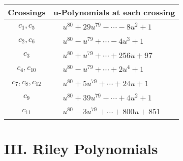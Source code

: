 \documentclass[1p]{elsarticle_modified}
\theoremstyle{definition}
\begin{document}
\begin{tabular}{m{50pt}|m{274pt}}
Crossings & \hspace{64pt}u-Polynomials at each crossing \\
\hline $$\begin{aligned}c_{1},c_{5}\end{aligned}$$&$\begin{aligned}
&u^{80}+29 u^{79}+\cdots-8 u^2+1
\end{aligned}$\\
\hline $$\begin{aligned}c_{2},c_{6}\end{aligned}$$&$\begin{aligned}
&u^{80}- u^{79}+\cdots-4 u^3+1
\end{aligned}$\\
\hline $$\begin{aligned}c_{3}\end{aligned}$$&$\begin{aligned}
&u^{80}+u^{79}+\cdots+256 u+97
\end{aligned}$\\
\hline $$\begin{aligned}c_{4},c_{10}\end{aligned}$$&$\begin{aligned}
&u^{80}- u^{79}+\cdots+2 u^4+1
\end{aligned}$\\
\hline $$\begin{aligned}c_{7},c_{8},c_{12}\end{aligned}$$&$\begin{aligned}
&u^{80}+5 u^{79}+\cdots+24 u+1
\end{aligned}$\\
\hline $$\begin{aligned}c_{9}\end{aligned}$$&$\begin{aligned}
&u^{80}+39 u^{79}+\cdots+4 u^2+1
\end{aligned}$\\
\hline $$\begin{aligned}c_{11}\end{aligned}$$&$\begin{aligned}
&u^{80}-3 u^{79}+\cdots+800 u+851
\end{aligned}$\\
\hline
\end{tabular}\newpage\renewcommand{\arraystretch}{1}
\centering \section*{ III. Riley Polynomials}
\end{document}
